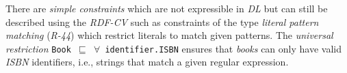 \documentclass[a4paper,fontsize=11pt]{scrartcl}
\newcommand{\tb}[1]{\todo[size=\small, color=green!40]{\textbf{Thomas:} #1}}
\newcommand{\ms}[1]{\texttt{#1}}
\begin{document}
There are \emph{simple constraints} which are not expressible in \emph{DL} but can still be described using the \emph{RDF-CV} 
such as constraints of the type \emph{literal pattern matching} (\emph{R-44}) which restrict literals to match given patterns.
The \emph{universal restriction} {\small\ms{Book $\sqsubseteq$ $\forall$ identifier.ISBN}} ensures that \emph{books} can only have valid \emph{ISBN} identifiers, 
i.e., strings that match a given regular expression.
%
\end{document}
